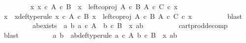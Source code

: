 \begin{isabellebody}
\ \ \ \ \ \ \isamarkupfalse%
\ {\isachardoublequoteopen}{\isasymexists}\ x{\isacharprime}{\kern0pt}{\isachardot}{\kern0pt}\ x{\isacharprime}{\kern0pt}\ {\isasymin}\isactrlsub c\ A\ {\isasymtimes}\isactrlsub c\ B\ {\isasymand}\ x\ {\isacharequal}{\kern0pt}\ {\isacharparenleft}{\kern0pt}left{\isacharunderscore}{\kern0pt}coproj\ {\isacharparenleft}{\kern0pt}A\ {\isasymtimes}\isactrlsub c\ B{\isacharparenright}{\kern0pt}\ {\isacharparenleft}{\kern0pt}A\ {\isasymtimes}\isactrlsub c\ C{\isacharparenright}{\kern0pt}{\isacharparenright}{\kern0pt}\ {\isasymcirc}\isactrlsub c\ x{\isacharprime}{\kern0pt}{\isachardoublequoteclose}\isanewline
\ \ \ \ \ \ \isamarkupfalse%
\ \isamarkupfalse%
\ x{\isacharprime}{\kern0pt}\ \ x{\isacharprime}{\kern0pt}{\isacharunderscore}{\kern0pt}def{\isacharbrackleft}{\kern0pt}type{\isacharunderscore}{\kern0pt}rule{\isacharbrackright}{\kern0pt}{\isacharcolon}{\kern0pt}\ {\isachardoublequoteopen}x{\isacharprime}{\kern0pt}\ {\isasymin}\isactrlsub c\ A\ {\isasymtimes}\isactrlsub c\ B{\isachardoublequoteclose}\ {\isachardoublequoteopen}x\ {\isacharequal}{\kern0pt}\ left{\isacharunderscore}{\kern0pt}coproj\ {\isacharparenleft}{\kern0pt}A\ {\isasymtimes}\isactrlsub c\ B{\isacharparenright}{\kern0pt}\ {\isacharparenleft}{\kern0pt}A\ {\isasymtimes}\isactrlsub c\ C{\isacharparenright}{\kern0pt}\ {\isasymcirc}\isactrlsub c\ x{\isacharprime}{\kern0pt}{\isachardoublequoteclose}\isanewline
\ \ \ \ \ \ \ \ \isamarkupfalse%
\ blast\isanewline
\ \ \ \ \ \ \isamarkupfalse%
\ \isamarkupfalse%
\ ab{\isacharunderscore}{\kern0pt}exists{\isacharcolon}{\kern0pt}\ {\isachardoublequoteopen}{\isasymexists}\ a\ b{\isachardot}{\kern0pt}\ a\ {\isasymin}\isactrlsub c\ A\ {\isasymand}\ b\ {\isasymin}\isactrlsub c\ B\ {\isasymand}\ x{\isacharprime}{\kern0pt}\ {\isacharequal}{\kern0pt}{\isasymlangle}a{\isacharcomma}{\kern0pt}b{\isasymrangle}{\isachardoublequoteclose}\isanewline
\ \ \ \ \ \ \ \ \isamarkupfalse%
\ cart{\isacharunderscore}{\kern0pt}prod{\isacharunderscore}{\kern0pt}decomp\ \isamarkupfalse%
\ blast\isanewline
\ \ \ \ \ \ \isamarkupfalse%
\ \isamarkupfalse%
\ a\ b\ \ ab{\isacharunderscore}{\kern0pt}def{\isacharbrackleft}{\kern0pt}type{\isacharunderscore}{\kern0pt}rule{\isacharbrackright}{\kern0pt}{\isacharcolon}{\kern0pt}\ {\isachardoublequoteopen}a\ {\isasymin}\isactrlsub c\ A{\isachardoublequoteclose}\ {\isachardoublequoteopen}b\ {\isasymin}\isactrlsub c\ B{\isachardoublequoteclose}\ \ {\isachardoublequoteopen}x{\isacharprime}{\kern0pt}\ {\isacharequal}{\kern0pt}{\isasymlangle}a{\isacharcomma}{\kern0pt}b{\isasymrangle}{\isachardoublequoteclose}\isanewline

\end{isabellebody}
